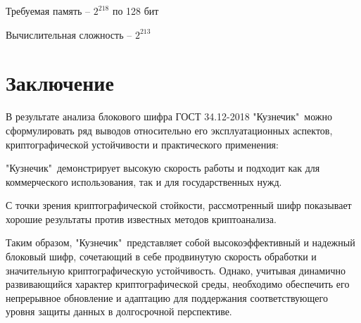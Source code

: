 \documentclass[colorthm]{../civarticle}
\begin{document}
Требуемая память – $2^{218}$ по 128 бит

Вычислительная сложность – $2^{213}$

\section{Заключение}


В результате анализа блокового шифра ГОСТ 34.12-2018 "Кузнечик"\, можно сформулировать ряд выводов относительно его эксплуатационных аспектов, криптографической устойчивости и практического применения: 

"Кузнечик"\ демонстрирует высокую скорость работы и подходит как для коммерческого использования, так и для государственных нужд.

С точки зрения криптографической стойкости, рассмотренный шифр показывает хорошие результаты против известных методов криптоанализа. 

Таким образом, "Кузнечик"\ представляет собой высокоэффективный и надежный блоковый шифр, сочетающий в себе продвинутую скорость обработки и значительную криптографическую устойчивость. Однако, учитывая динамично развивающийся характер криптографической среды, необходимо обеспечить его непрерывное обновление и адаптацию для поддержания соответствующего уровня защиты данных в долгосрочной перспективе.








\label{sec:minted}
\if \MINTED\empty
\else \inputminted{python}{code.py} \fi
\end{document}
